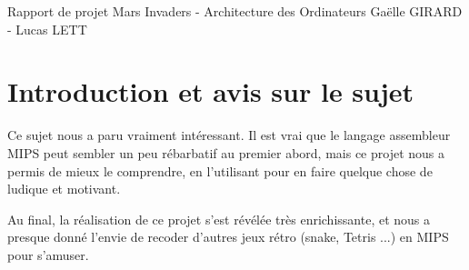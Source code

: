 \documentclass[a4paper,12pt]{report}
\begin{document}
  \begin{center}
   \Huge Rapport de projet
   \linebreak
   \linebreak
   \normalsize Mars Invaders - Architecture des Ordinateurs
   \linebreak
   \linebreak
   Gaëlle GIRARD - Lucas LETT
  \end{center}

\section*{Introduction et avis sur le sujet}
Ce sujet nous a paru vraiment intéressant. Il est vrai que le langage assembleur MIPS peut sembler un peu rébarbatif au premier abord, mais ce projet nous a permis de mieux le comprendre, en l'utilisant pour en faire quelque chose de ludique et motivant.\par
Au final, la réalisation de ce projet s'est révélée très enrichissante, et nous a presque donné l'envie de recoder d'autres jeux rétro (snake, Tetris ...) en MIPS pour s'amuser. 
\end{document}
